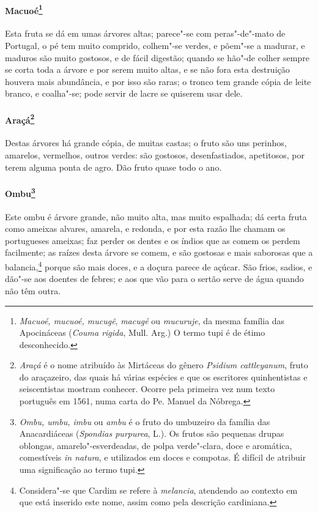\paragraph{Macuoé\footnote{ \textit{Macuoé, mucuoé, mucugê}, 
\textit{macugé} ou \textit{mucuruje}, da mesma família das Apocináceas
(\textit{Couma rigida}, Mull. Arg.) O termo tupi é de étimo
desconhecido.}} Esta fruta se dá em umas árvores
altas; parece"-se com peras"-de"-mato de Portugal, o pé tem muito
comprido, colhem"-se verdes, e põem"-se a madurar, e maduros são muito
gostosos, e de fácil digestão; quando se hão"-de colher sempre se corta
toda a árvore e por serem muito altas, e se não fora esta destruição
houvera mais abundância, e por isso são raras; o tronco tem grande
cópia de leite branco, e coalha"-se; pode servir de lacre se quiserem
usar dele.

\paragraph{Araçá\footnote{ \textit{Araçá} é o nome atribuído às
Mirtáceas do gênero \textit{Psidium cattleyanum}, fruto do
araçazeiro, das quais há várias espécies e que os escritores
quinhentistas e seiscentistas mostram conhecer. Ocorre pela primeira
vez num texto português em 1561, numa carta do Pe. Manuel da
Nóbrega.}} Destas árvores há grande cópia, de muitas
castas; o fruto são uns perinhos, amarelos, vermelhos, outros verdes:
são gostosos, desenfastiados, apetitosos, por terem alguma ponta de
agro. Dão fruto quase todo o ano.

\paragraph{Ombu\footnote{ \textit{Ombu, umbu, imbu} ou \textit{ambu} é
o fruto do umbuzeiro da família das Anacardiáceas (\textit{Spondias
purpurea}, L.). Os frutos são pequenas drupas oblongas,
amarelo"-esverdeadas, de polpa verde"-clara, doce e aromática,
comestíveis \textit{in natura}, e utilizados em doces e compotas. É
difícil de atribuir uma significação ao termo tupi.}} Este
ombu é árvore grande, não muito alta, mas muito espalhada; dá certa
fruta como ameixas alvares, amarela, e redonda, e por esta razão lhe
chamam os portugueses ameixas; faz perder os dentes e os índios que as
comem os perdem facilmente; as raízes desta árvore se comem, e são
gostosas e mais saborosas que a balancia,\footnote{ Considera"-se que
Cardim se refere à \textit{melancia}, atendendo ao contexto em que está
inserido este nome, assim como pela descrição cardiniana.} porque
são mais doces, e a doçura parece de açúcar. São frios, sadios, e
dão"-se aos doentes de febres; e aos que vão para o sertão serve de água
quando não têm outra. 

